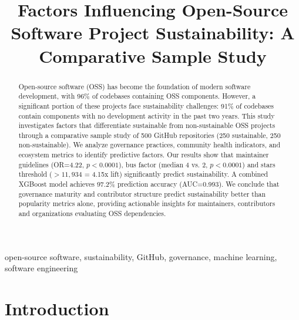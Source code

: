 \documentclass[conference]{IEEEtran}
\begin{document}
\title{Factors Influencing Open-Source Software Project Sustainability: A Comparative Sample Study}

\author{
}

\maketitle

\begin{abstract}
Open-source software (OSS) has become the foundation of modern software development, with 96\% of codebases containing OSS components. However, a significant portion of these projects face sustainability challenges: 91\% of codebases contain components with no development activity in the past two years. This study investigates factors that differentiate sustainable from non-sustainable OSS projects through a comparative sample study of 500 GitHub repositories (250 sustainable, 250 non-sustainable). We analyze governance practices, community health indicators, and ecosystem metrics to identify predictive factors. Our results show that maintainer guidelines (OR=4.22, $p<0.0001$), bus factor (median 4 vs. 2, $p<0.0001$) and stars threshold ($>11,934$ = 4.15x lift) significantly predict sustainability. A combined XGBoost model achieves 97.2\% prediction accuracy (AUC=0.993). We conclude that governance maturity and contributor structure predict sustainability better than popularity metrics alone, providing actionable insights for maintainers, contributors and organizations evaluating OSS dependencies.
\end{abstract}

\begin{IEEEkeywords}
open-source software, sustainability, GitHub, governance, machine learning, software engineering
\end{IEEEkeywords}

\section{Introduction}
\end{document}
